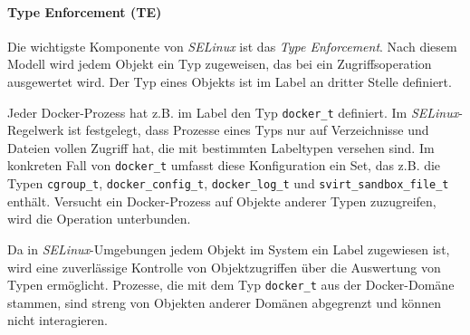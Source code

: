 \documentclass[../main.tex]{subfiles}
\begin{document}

				\paragraph{Type Enforcement (TE)}
					Die wichtigste Komponente von \emph{SELinux} ist das \emph{Type Enforcement}. Nach diesem Modell wird jedem Objekt ein Typ zugeweisen, das bei ein Zugriffsoperation ausgewertet wird. Der Typ eines Objekts ist im Label an dritter Stelle definiert.

					Jeder Docker-Prozess hat z.B. im Label den Typ \texttt{docker\_t} definiert. Im \emph{SELinux}-Regelwerk ist festgelegt, dass Prozesse eines Typs nur auf Verzeichnisse und Dateien vollen Zugriff hat, die mit bestimmten Labeltypen versehen sind. Im konkreten Fall von \texttt{docker\_t} umfasst diese Konfiguration ein Set, das z.B. die Typen \texttt{cgroup\_t}, \texttt{docker\_config\_t}, \texttt{docker\_log\_t} und \texttt{svirt\_sandbox\_file\_t} enthält. Versucht ein Docker-Prozess auf Objekte anderer Typen zuzugreifen, wird die Operation unterbunden.

					Da in \emph{SELinux}-Umgebungen jedem Objekt im System ein Label zugewiesen ist, wird eine zuverlässige Kontrolle von Objektzugriffen über die Auswertung von Typen ermöglicht. Prozesse, die mit dem Typ \texttt{docker\_t} aus der Docker-Domäne stammen, sind streng von Objekten anderer Domänen abgegrenzt und können nicht interagieren.

\end{document}
